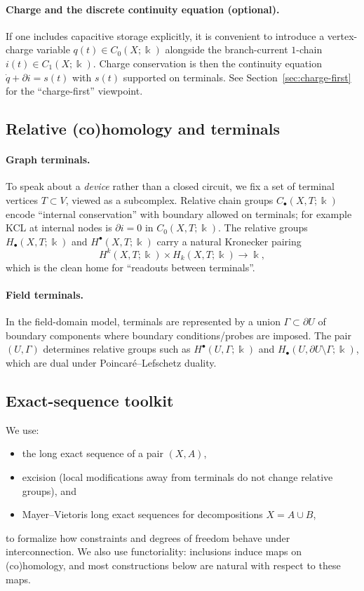 \documentclass[11pt]{article}
\begin{document}
\paragraph{Charge and the discrete continuity equation (optional).}
If one includes capacitive storage explicitly, it is convenient to introduce a vertex-charge variable $q(t)\in C_0(X;\Bbbk)$ alongside the branch-current $1$-chain $i(t)\in C_1(X;\Bbbk)$.
Charge conservation is then the continuity equation $\dot q+\partial i=s(t)$ with $s(t)$ supported on terminals.
See Section~\ref{sec:charge-first} for the ``charge-first'' viewpoint.

\subsection{Relative (co)homology and terminals}
\paragraph{Graph terminals.}
To speak about a \emph{device} rather than a closed circuit, we fix a set of terminal vertices $T\subset V$, viewed as a subcomplex.
Relative chain groups $C_\bullet(X,T;\Bbbk)$ encode ``internal conservation'' with boundary allowed on terminals; for example KCL at internal nodes is $\partial i=0$ in $C_0(X,T;\Bbbk)$.
The relative groups $H_\bullet(X,T;\Bbbk)$ and $H^\bullet(X,T;\Bbbk)$ carry a natural Kronecker pairing
\[
H^k(X,T;\Bbbk)\times H_k(X,T;\Bbbk)\to \Bbbk,
\]
which is the clean home for ``readouts between terminals''.

\paragraph{Field terminals.}
In the field-domain model, terminals are represented by a union $\Gamma\subset \partial U$ of boundary components where boundary conditions/probes are imposed.
The pair $(U,\Gamma)$ determines relative groups such as $H^\bullet(U,\Gamma;\Bbbk)$ and $H_\bullet(U,\partial U\setminus \Gamma;\Bbbk)$, which are dual under Poincar\'e--Lefschetz duality.

\subsection{Exact-sequence toolkit}
We use:
\begin{itemize}
  \item the long exact sequence of a pair $(X,A)$,
  \item excision (local modifications away from terminals do not change relative groups), and
  \item Mayer--Vietoris long exact sequences for decompositions $X=A\cup B$,
\end{itemize}
to formalize how constraints and degrees of freedom behave under interconnection.
We also use functoriality: inclusions induce maps on (co)homology, and most constructions below are natural with respect to these maps.
\end{document}

